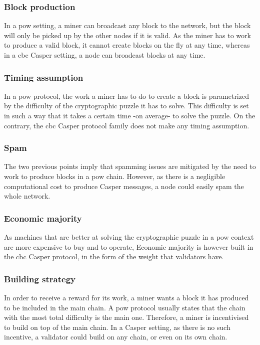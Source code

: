 \subsubsection{Block production}
In a \gls{pow}\cite{yellowpaper} setting, a miner can broadcast any block to the network, but the
block will only be picked up by the other nodes if it is valid. As the miner has
to work to produce a valid block, it cannot create blocks on the fly at any
time, whereas in a \gls{cbc} Casper setting, a node can broadcast blocks at any
time. 

\subsubsection{Timing assumption}
In a \gls{pow} protocol, the work a miner has to do to create a block is
parametrized by the difficulty of the cryptographic puzzle it has to solve. This
difficulty is set in such a way that it takes a certain time -on average- to
solve the puzzle. On the contrary, the \gls{cbc} Casper protocol family does not
make any timing assumption.

\subsubsection{Spam}
The two previous points imply that spamming issues are mitigated by the need to
work to produce blocks in a \gls{pow} chain. However, as there is a negligible
computational cost to produce Casper messages, a node could easily spam the
whole network.

\subsubsection{Economic majority}
As machines that are better at solving the cryptographic puzzle in a \gls{pow}
context are more expensive to buy and to operate, 
Economic majority is however built in the \gls{cbc} Casper protocol, in the form
of the weight that validators have.

\subsubsection{Building strategy}
In order to receive a reward for its work, a miner wants a block it has produced
to be included in the main chain. A \gls{pow} protocol usually states that the
chain with the most total difficulty is the main one. Therefore, a miner is
incentivised to build on top of the main chain. 
In a Casper setting, as there is no such incentive, a validator could build on
any chain, or even on its own chain.


